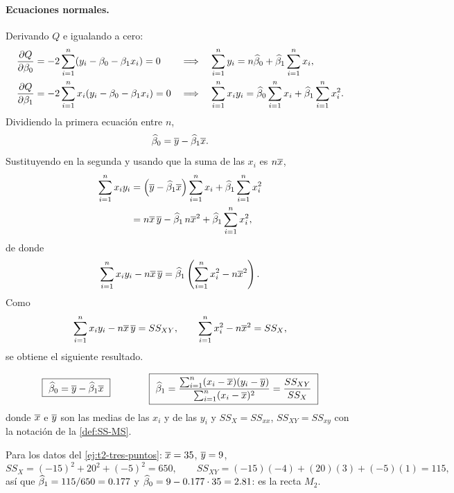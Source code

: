 \paragraph{Ecuaciones normales.} Derivando $Q$ e igualando a cero:
\begin{align*}
  \frac{\partial Q}{\partial\beta_0} &= -2\sum_{i=1}^{n} (y_i-\beta_0-\beta_1x_i) = 0
  &&\Longrightarrow\quad \sum_{i=1}^{n} y_i = n\widehat{\beta}_0 + \widehat{\beta}_1\sum_{i=1}^{n} x_i, \\
  \frac{\partial Q}{\partial\beta_1} &= -2\sum_{i=1}^{n} x_i(y_i-\beta_0-\beta_1x_i) = 0
  &&\Longrightarrow\quad \sum_{i=1}^{n} x_iy_i = \widehat{\beta}_0\sum_{i=1}^{n} x_i + \widehat{\beta}_1\sum_{i=1}^{n} x_i^2 .
\end{align*}
Dividiendo la primera ecuación entre $n$,
\[
  \widehat{\beta}_0 = \overline{y} - \widehat{\beta}_1\overline{x} .
\]
Sustituyendo en la segunda y usando que la suma de las $x_i$ es $n\overline{x}$,
\begin{align*}
  \sum_{i=1}^{n} x_iy_i &= \left(\overline{y}-\widehat{\beta}_1\overline{x}\right)\sum_{i=1}^{n} x_i + \widehat{\beta}_1\sum_{i=1}^{n} x_i^2 \\
  &= n\overline{x}\,\overline{y} - \widehat{\beta}_1\,n\overline{x}^2 + \widehat{\beta}_1\sum_{i=1}^{n} x_i^2 ,
\end{align*}
de donde
\[
  \sum_{i=1}^{n} x_iy_i - n\overline{x}\,\overline{y} = \widehat{\beta}_1\left(\sum_{i=1}^{n} x_i^2 - n\overline{x}^2\right).
\]
Como
\[
  \sum_{i=1}^{n} x_iy_i - n\overline{x}\,\overline{y} = SS_{XY},
  \qquad
  \sum_{i=1}^{n} x_i^2 - n\overline{x}^2 = SS_X ,
\]
se obtiene el siguiente resultado.

\begin{teorema}
  \[
    \boxed{\ \widehat{\beta}_0 = \overline{y} - \widehat{\beta}_1\overline{x}\ }
    \qquad\qquad
    \boxed{\ \widehat{\beta}_1 = \frac{\sum_{i=1}^{n} (x_i-\overline{x})(y_i-\overline{y})}{\sum_{i=1}^{n} (x_i-\overline{x})^2}
    = \frac{SS_{XY}}{SS_X}\ }
  \]
  donde $\overline{x}$ e $\overline{y}$ son las medias de las $x_i$ y de las $y_i$ y $SS_X=SS_{xx}$,
  $SS_{XY}=SS_{xy}$ con la notación de la \cref{def:SS-MS}.
\end{teorema}

\begin{ejemplo}
  Para los datos del \cref{ej:t2-tres-puntos}: $\overline{x}=35$, $\overline{y}=9$,
  \[
    SS_X = (-15)^2+20^2+(-5)^2 = 650, \qquad
    SS_{XY} = (-15)(-4)+(20)(3)+(-5)(1) = 115,
  \]
  así que $\widehat{\beta}_1 = 115/650 = 0.177$ y $\widehat{\beta}_0 = 9-0.177\cdot35 = 2.81$: es la
  recta $M_2$.
\end{ejemplo}

